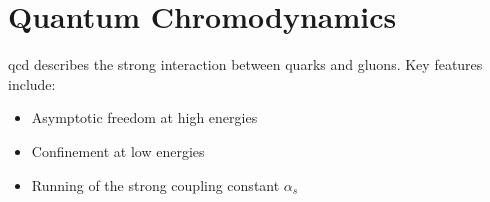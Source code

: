 \section{Quantum Chromodynamics}
\label{sec:THEORY_QUANTUM_CHROMODYNAMICS}

\Gls{qcd} describes the strong interaction between quarks and gluons. Key features include:
\begin{itemize}
  \item Asymptotic freedom at high energies~\cite{qcd-asymptotic-freedom,politzer-qcd}
  \item Confinement at low energies
  \item Running of the strong coupling constant $\alpha_s$
\end{itemize}

